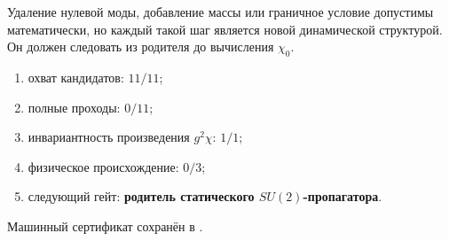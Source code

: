 \begin{nogocriterion}
Удаление нулевой моды, добавление массы или граничное условие допустимы
математически, но каждый такой шаг является новой динамической структурой.
Он должен следовать из родителя до вычисления $\chi_0$.
\end{nogocriterion}

\begin{protocol}\begin{enumerate}
\item охват кандидатов: \textbf{$11/11$};
\item полные проходы: \textbf{$0/11$};
\item инвариантность произведения $g^2\chi$: \textbf{$1/1$};
\item физическое происхождение: \textbf{$0/3$};
\item следующий гейт: \textbf{родитель статического $SU(2)$-пропагатора}.
\end{enumerate}\end{protocol}

Машинный сертификат сохранён в
.